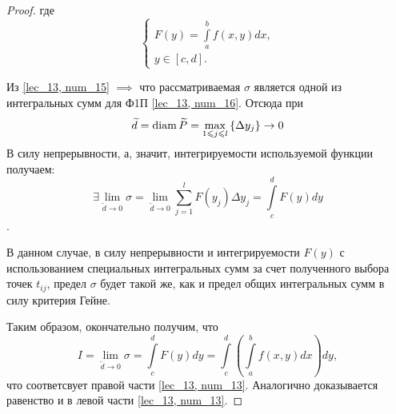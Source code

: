\documentclass[../../main.tex]{subfiles}
\begin{document}
\begin{proof}
 	где
 	\begin{equation}
 	\label{lec_13, num_16}
 	\begin{cases}
 	F \left( y \right) = \int\limits_a^b f \left( x, y \right) dx, \\
 	y \in \left[ c, d \right]. 
 	\end{cases}
 	\end{equation}
 	
 	Из \eqref{lec_13, num_15} $ \implies $ что рассматриваемая $\sigma$
 	является одной из интегральных сумм для Ф1П  \eqref{lec_13, num_16}.
 	Отсюда при 
 	\[ \widetilde{d} = \operatorname{diam} \widetilde{P} = 
 		\underset{1 \leqslant j \leqslant l} {\max} \left\lbrace \Delta y_j \right\rbrace 
 	\to 0 \]
 	В силу непрерывности, а, значит, интегрируемости
 	используемой функции получаем: 
 	\[ \exists \lim\limits_{ \widetilde{d} \to 0 } \sigma = 
 	\lim\limits_{ \widetilde{d} \to 0 } 
 	\sum\limits_{j = 1}^l F \left( y_j \right) \Delta y_j =
 	\int\limits_c^d F \left( y \right)dy  \].
 	
 	В данном случае, в силу непрерывности и 
 	интегрируемости $F(y)$ с использованием
 	специальных интегральных сумм за счет полученного 
 	выбора точек $t_{ij}$, предел 
 	$ \sigma $ будет такой же, как и предел общих интегральных сумм 
 	в силу критерия Гейне.
 	
 	Таким образом, окончательно получим, что
 	\[ I = \lim\limits_{ \widetilde{d} \to 0 } \sigma = 
 	\int\limits_c^d F \left( y \right) dy =
 	\int\limits_c^d \left( \int\limits_a^b 
 	f \left( x, y\right) dx \right) dy, \]
 	что соответсвует правой части \eqref {lec_13, num_13}.
 	Аналогично доказывается равенство и в левой части \eqref {lec_13, num_13}.
\end{proof}
\end{document}
